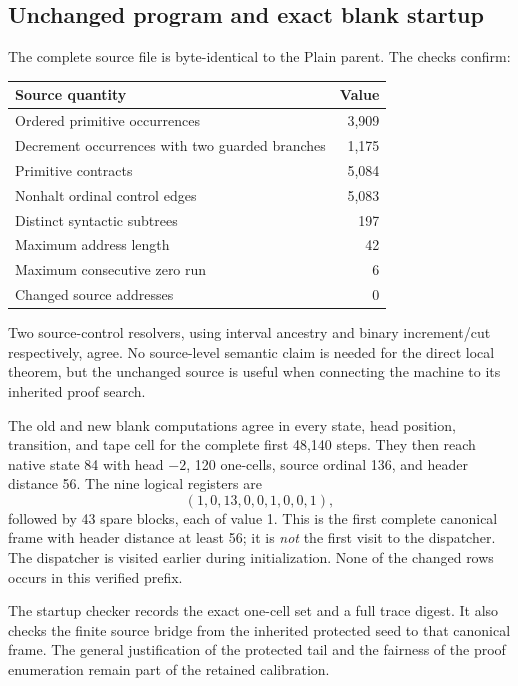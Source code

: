 \documentclass[11pt,letterpaper]{article}
\begin{document}
\subsection{Unchanged program and exact blank startup}
The complete source file is byte-identical to the Plain parent.
The checks confirm:
\begin{center}
\begin{tabular}{@{}lr@{}}
\toprule
Source quantity & Value\\
\midrule
Ordered primitive occurrences & 3,909\\
Decrement occurrences with two guarded branches & 1,175\\
Primitive contracts & 5,084\\
Nonhalt ordinal control edges & 5,083\\
Distinct syntactic subtrees & 197\\
Maximum address length & 42\\
Maximum consecutive zero run & 6\\
Changed source addresses & 0\\
\bottomrule
\end{tabular}
\end{center}
Two source-control resolvers, using interval ancestry and binary
increment/cut respectively, agree. No source-level semantic claim is needed
for the direct local theorem, but the unchanged source is useful when
connecting the machine to its inherited proof search.

The old and new blank computations agree in every state, head position,
transition, and tape cell for the complete first 48,140 steps. They then
reach native state 84 with head $-2$, 120 one-cells, source ordinal 136,
and header distance 56. The nine logical registers are
\[
                   (1,0,13,0,0,1,0,0,1),
\]
followed by 43 spare blocks, each of value 1.
This is the first complete canonical frame with header distance at least
56; it is \emph{not} the first visit to the dispatcher. The dispatcher is
visited earlier during initialization. None of the changed rows occurs in
this verified prefix.

The startup checker records the exact one-cell set and a full trace digest.
It also checks the finite source bridge from the inherited protected seed to
that canonical frame. The general justification of the protected tail and
the fairness of the proof enumeration remain part of the retained calibration.
\end{document}
